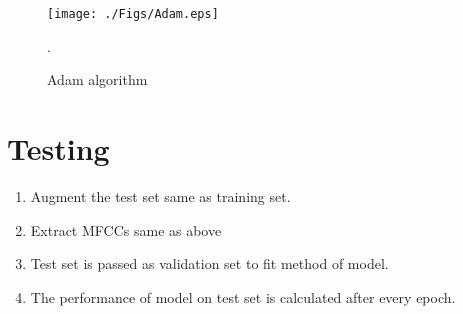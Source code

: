 \documentclass[11pt,english]{article}
\begin{document}
\begin{figure}[!ht]
\centering
\texttt{[image: ./Figs/Adam.eps]}
\caption{ Adam algorithm}.
\label{fig: Adam}	
\end{figure}


\section{Testing}
\begin{enumerate}
    \item Augment the test set same as training set.
    \item Extract MFCCs same as above
    \item Test set is passed as validation set to fit method of model.
    \item The performance of model on test set is calculated after every epoch.
\end{enumerate}
\end{document}
